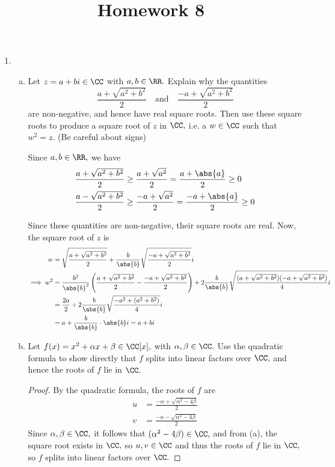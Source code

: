 \documentclass{article}
\begin{document}
\title{Homework 8}
\maketitle
\thispagestyle{fancy}

\begin{enumerate}
	\item 
		\begin{enumerate}[(a)]
			\item Let $z=a+bi\in\CC$ with $a, b\in\RR.$ Explain why the quantities
				\[\frac{a+\sqrt{a^2+b^2}}{2}\quad\text{and}\quad\frac{-a+\sqrt{a^2+b^2}}{2}\]
				are non-negative, and hence have real square roots. Then use these square roots to produce a square root of $z$ in $\CC,$ i.e. a $w\in\CC$ such that $w^2=z.$ (Be careful about signs)
				\begin{soln}
					Since $a, b\in \RR,$ we have
					\begin{align*}
						\frac{a+\sqrt{a^2+b^2}}{2} &\ge \frac{a+\sqrt{a^2}}{2} = \frac{a+\abs{a}}{2} \ge 0 \\
						\frac{a-\sqrt{a^2+b^2}}{2} &\ge \frac{-a+\sqrt{a^2}}{2} = \frac{-a+\abs{a}}{2} \ge 0
					\end{align*}

					Since these quantities are non-negative, their square roots are real. Now, the square root of $z$ is
					\begin{align*}
						w&=\sqrt{\frac{a+\sqrt{a^2+b^2}}{2}} + \frac{b}{\abs{b}}\sqrt{\frac{-a+\sqrt{a^2+b^2}}{2}}i \\
						\implies w^2 &= \frac{b^2}{\abs{b}^2}\left(\frac{a+\sqrt{a^2+b^2}}{2} - \frac{-a+\sqrt{a^2+b^2}}{2}\right) + 2\frac{b}{\abs{b}}\sqrt{\frac{(a+\sqrt{a^2+b^2})(-a+\sqrt{a^2+b^2})}{4}}i \\
						&= \frac{2a}{2} + 2\frac{b}{\abs{b}}\sqrt{\frac{-a^2+(a^2+b^2)}{4}}i \\
						&= a+\frac{b}{\abs{b}}\cdot\abs{b} i = a+bi
					\end{align*}
				\end{soln}

			\item Let $f(x)=x^2+\alpha x+\beta\in\CC[x],$ with $\alpha, \beta\in\CC.$ Use the quadratic formula to show directly that $f$ splits into linear factors over $\CC,$ and hence the roots of $f$ lie in $\CC.$
				\begin{proof}
					By the quadratic formula, the roots of $f$ are
					\begin{align*}
						u &= \frac{-\alpha + \sqrt{\alpha^2-4\beta}}{2} \\
						v &= \frac{-a-\sqrt{\alpha^2-4\beta}}{2}
					\end{align*}
					Since $\alpha, \beta\in\CC,$ it follows that $(\alpha^2-4\beta)\in\CC,$ and from (a), the square root exists in $\CC,$ so $u, v\in\CC$ and thus the roots of $f$ lie in $\CC,$ so $f$ splits into linear factors over $\CC.$
				\end{proof}
				
		\end{enumerate}
		
\end{enumerate}
\end{document}
